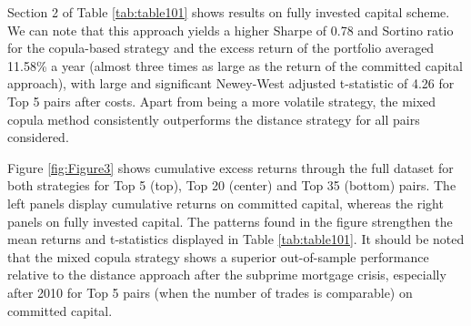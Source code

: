 \vspace{0.6cm}

Section 2 of Table \ref{tab:table101} shows results on fully invested capital scheme. We can note that this approach yields a higher Sharpe of 0.78 and Sortino ratio for the copula-based strategy and the excess return of the portfolio averaged 11.58\% a year (almost three times as large as the return of the committed capital approach), with large and significant Newey-West adjusted t-statistic of 4.26 for Top 5 pairs after costs. Apart from being a more volatile strategy, the mixed copula method consistently outperforms the distance strategy for all pairs considered.

Figure \ref{fig:Figure3} shows cumulative excess returns through the full dataset for both strategies for Top 5 (top), Top 20 (center) and Top 35 (bottom) pairs. The left panels display cumulative returns on committed capital, whereas the right panels on fully invested capital. The patterns found in the figure strengthen the mean returns and t-statistics displayed in Table \ref{tab:table101}. It should be noted that the mixed copula strategy shows a superior out-of-sample performance relative to the distance approach after the subprime mortgage crisis, especially after 2010 for Top 5 pairs (when the number of trades is comparable) on committed capital. 

